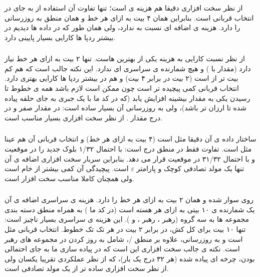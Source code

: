 \documentclass[12pt,a4paper]{article}
\begin{document}
از نظر سخت افزاری دقیقا هم هزینه ی  است؛ تنها تفاوت آن استفاده از  به جای  در انتخاب قربانی است. بنابراین همان ۴ بیت به ازای هر خط و همان منطق به روزرسانی را دارد. هزینه ی اضافه ای نسبت به  ندارد، ولی همان طور که در داده ها دیدیم در بیشتر ردپا ها کارایی بسیار پایینی دارد.

\subsubsection{}

از نظر نسبت کارایی به هزینه یکی از بهترین هاست. تنها ۲ بیت به ازای هر خط نیاز دارد (مقدار  با ) و هیچ شمارنده ی سراسری ای ندارد. این نکته جالب است که  هم کم بیت تر از  است (۲ بیت در برابر ۴ بیت) و هم در بیشتر ردپا ها کارایی بهتری دارد. انتخاب قربانی کمی پیچیده تر است چون ممکن است لازم باشد  همه ی خطوط تا رسیدن یکی به مقدار بیشینه افزایش یابد (که در کد ما با یک  جبری به جای حلقه پیاده شده تا ارزان تر باشد)، ولی به روزرسانی آن بسیار ساده است: در  مقدار صفر و در درج مقدار . از نظر سخت افزاری بسیار مناسب است.

\subsubsection{}

ساختار داده ی آن دقیقا مثل  است (۴ بیت به ازای هر خط) و انتخاب قربانی آن هم عینا مثل  است. تفاوت فقط در منطق درج است: با احتمال ۱/۳۲ بلوک جدید را در موقعیت  و با احتمال ۳۱/۳۲ در موقعیت  قرار می دهد. بنابراین سربار سخت افزاری اضافه ی آن تنها یک مولد تصادفی کوچک و پارامتر $\varepsilon$ است. پیچیدگی آن کمی بیشتر از  خام است ولی همچنان کاملا مناسب سخت افزار است.

\subsubsection{}

روی  سوار شده و همان ۲ بیت  به ازای هر خط را دارد. هزینه ی سراسری اضافه ی آن یک شمارنده ی  ۱۰ بیتی به ازای هر هسته است (در کد ما ) به همراه منطق دسته بندی مجموعه ها به سه گروه (رهبر ، رهبر ، و ). این هزینه ی سراسری بسیار ناچیز است: تنها ۱۰ بیت برای کل کش، در برابر ۲ بیت در هر تک تک خطوط. انتخاب قربانی مثل  است و به روزرسانی، علاوه بر منطق /، شامل به روز کردن  در مجموعه های رهبر است. نکته ی جالب سخت افزاری این است که  در پیاده سازی ما به جای احتمالی بودن، چرخه ای پیاده شده (هر ۳۲ درج یک بار)، که از نظر عملکردی تقریبا یکسان ولی از نظر سخت افزاری ساده تر از یک مولد تصادفی است.
\end{document}
